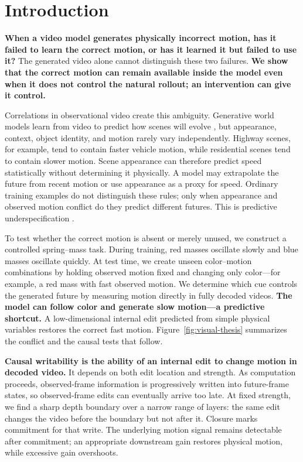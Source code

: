 \documentclass{article}
\newcommand{\introhighlight}[1]{{\bfseries #1}}
\begin{document}
\section{Introduction}

\introhighlight{When a video model generates physically incorrect motion, has it failed
to learn the correct motion, or has it learned it but failed to use it?} The
generated video alone cannot distinguish these two failures. \introhighlight{We show
that the correct motion can remain available inside the model even when it does
not control the natural rollout; an intervention can give it control.}

Correlations in observational video create this ambiguity.
Generative world models learn from video to predict how scenes will evolve
\citep{ha2018worldmodels,hafner2020dream,ho2022video}, but appearance, context,
object identity, and motion rarely vary independently. Highway scenes, for
example, tend to contain faster vehicle motion, while residential scenes tend to
contain slower motion. Scene appearance can therefore predict speed statistically
without determining it physically. A model may extrapolate the future from recent
motion or use appearance as a proxy for speed. Ordinary training examples do not
distinguish these rules; only when appearance and observed motion conflict do they
predict different futures. This is predictive underspecification
\citep{geirhos2020shortcut,damour2022underspecification}.

To test whether the correct motion is absent or merely unused, we construct a
controlled spring--mass task. During training, red masses oscillate slowly and
blue masses oscillate quickly. At test time, we create unseen color--motion
combinations by holding observed motion fixed and changing only color---for
example, a red mass with fast observed motion. We determine which cue controls
the generated future by measuring motion directly in fully decoded videos.
\introhighlight{The model can follow color and generate slow motion---a predictive
shortcut.} A low-dimensional internal edit predicted from simple physical
variables restores the correct fast motion. Figure~\ref{fig:visual-thesis}
summarizes the conflict and the causal tests that follow.

\introhighlight{Causal writability is the ability of an internal edit to change motion
in decoded video.} It depends on both edit location and strength. As computation
proceeds, observed-frame information is progressively written into future-frame
states, so observed-frame edits can eventually arrive too late. At fixed
strength, we find a sharp depth boundary over a narrow range of layers: the same
edit changes the video before the boundary but not after it. Closure marks
commitment for that write. The underlying motion signal remains detectable after
commitment; an appropriate downstream gain restores physical motion, while
excessive gain overshoots.
\end{document}
